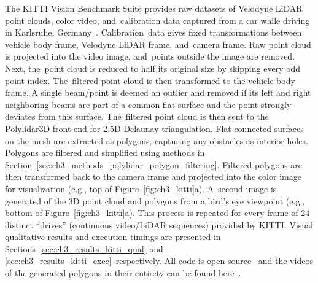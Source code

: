 The KITTI Vision Benchmark Suite provides raw datasets of Velodyne LiDAR point clouds, color video, and~calibration data captured from a car while driving in Karlsruhe, Germany~\cite{geiger_vision_2013}.  Calibration~data gives fixed transformations between vehicle body frame, Velodyne LiDAR frame, and~camera frame. Raw point cloud is projected into the video image, and~points outside the image are removed. Next, the~point cloud is reduced to half its original size by skipping every odd point index. The~filtered point cloud is then transformed to the vehicle body frame.
A single beam/point is deemed an outlier and removed if its left and right neighboring beams are part of a common flat surface and the point strongly deviates from this surface. The~filtered point cloud is then sent to the Polylidar3D front-end for 2.5D Delaunay triangulation. Flat connected surfaces on the mesh are extracted as polygons, capturing any obstacles as interior holes. Polygons are filtered and simplified using methods in Section~\ref{sec:ch3_methods_polylidar_polygon_filtering}. Filtered polygons are then transformed back to the camera frame and projected into the color image for visualization (e.g., top of Figure~\ref{fig:ch3_kitti}a). A~second image is generated of the 3D point cloud and polygons from a bird's eye viewpoint (e.g., bottom of Figure~\ref{fig:ch3_kitti}a). This process is repeated for every frame of 24 distinct ``drives'' (continuous video/LiDAR sequences) provided by KITTI.  Visual qualitative results and execution timings are presented in Sections~\ref{sec:ch3_results_kitti_qual} and \ref{sec:ch3_results_kitti_exec}~respectively. All code is open source~\cite{Castagno_Github_Polylidar3D_Kitti} and the videos of the generated polygons in their entirety can be found here~\cite{jeremy_castagno_polylidar3d_2020}. 



